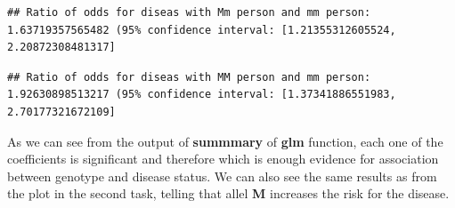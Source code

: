 \documentclass[
]{article}
\newenvironment{Shaded}{\begin{snugshade}}{\end{snugshade}}
\newcommand{\CharTok}[1]{\textcolor[rgb]{0.31,0.60,0.02}{#1}}
\newcommand{\DataTypeTok}[1]{\textcolor[rgb]{0.13,0.29,0.53}{#1}}
\newcommand{\DecValTok}[1]{\textcolor[rgb]{0.00,0.00,0.81}{#1}}
\newcommand{\FloatTok}[1]{\textcolor[rgb]{0.00,0.00,0.81}{#1}}
\newcommand{\KeywordTok}[1]{\textcolor[rgb]{0.13,0.29,0.53}{\textbf{#1}}}
\newcommand{\NormalTok}[1]{#1}
\newcommand{\OperatorTok}[1]{\textcolor[rgb]{0.81,0.36,0.00}{\textbf{#1}}}
\newcommand{\StringTok}[1]{\textcolor[rgb]{0.31,0.60,0.02}{#1}}
\begin{document}
\begin{Shaded}
\end{Shaded}

\begin{verbatim}
## Ratio of odds for diseas with Mm person and mm person: 1.63719357565482 (95% confidence interval: [1.21355312605524, 2.20872308481317]
\end{verbatim}

\begin{Shaded}
\end{Shaded}

\begin{verbatim}
## Ratio of odds for diseas with MM person and mm person: 1.92630898513217 (95% confidence interval: [1.37341886551983, 2.70177321672109]
\end{verbatim}

As we can see from the output of \textbf{summmary} of \textbf{glm}
function, each one of the coefficients is significant and therefore
which is enough evidence for association between genotype and disease
status. We can also see the same results as from the plot in the second
task, telling that allel \textbf{M} increases the risk for the disease.
\end{document}
